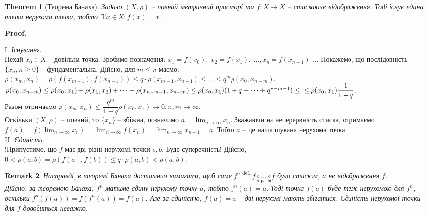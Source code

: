 \documentclass[a4paper, 10pt]{article}
\makeatletter
\theoremstyle{theoremdd}
\newtheorem{theorem}{Theorem}[subsection]
\theoremstyle{theoremdd}
\theoremstyle{theoremdd}
\theoremstyle{theoremdd}
\theoremstyle{theoremdd}
\theoremstyle{theoremdd}
\newtheorem{remark}[theorem]{Remark}
\theoremstyle{theoremdd}
\theoremstyle{theoremdd}
\renewenvironment{proof}[1][Proof.\\]{\par
\pushQED{\hfill \qed}%
\normalfont \topsep6\p@\@plus6\p@\relax
\trivlist
\item\relax
{\bfseries
#1\@addpunct{.}}\hspace\labelsep\ignorespaces
}{%
\popQED\endtrivlist\@endpefalse
}
\makeatother
\begin{document}
\begin{theorem}[Теорема Банаха]
Задано $(X,\rho)$ -- повний метричний просторі та $f \colon X \to X$ -- стискаюче відображення. Тоді існує єдина точка нерухома точка, тобто $\exists ! x \in X: f(x) = x$.
\end{theorem}

\begin{proof}
І. \textit{Існування}.\\
Нехай $x_0 \in X$ -- довільна точка. Зробимо позначення: $x_1 = f(x_0),\ x_2 = f(x_1),\ \dots, x_n = f(x_{n-1}), \dots$ Покажемо, що послідовність $\{x_n, n \geq 0\}$ -- фундаментальна. Дійсно, для $m \leq n$ маємо:\\
$\rho(x_m, x_n) = \rho(f(x_{m-1}), f(x_{n-1})) \leq q \cdot \rho(x_{m-1},x_{n-1}) \leq \dots \leq q^m \rho(x_0,x_{n-m})$.\\
$\rho(x_0,x_{n-m}) \leq \rho(x_0,x_1) + \rho(x_1,x_2) + \dots + \rho(x_{n-m-1}, x_{n-m}) \leq \rho(x_0,x_1)(1+q+\dots+q^{n-m-1}) \leq \\
\leq \rho (x_0,x_1) \dfrac{1}{1-q}$.\\
Разом отримаємо $\rho(x_m,x_n) \leq \dfrac{q^m}{1-q} \rho(x_0,x_1) \to 0, n,m \to \infty$.\\
Оскільки $(X,\rho)$ -- повний, то $\{x_n\}$ -- збіжна, позначимо $a = \displaystyle\lim_{n \to \infty} x_n$. Зважаючи на неперервність стиска, отримаємо $\displaystyle f(a) = f\left( \lim_{n \to \infty} x_n \right) = \lim_{n \to \infty} f(x_n) = \lim_{n \to \infty} x_{n+1} = a$. Тобто $a$ -- це наша шукана нерухома точка.
\bigskip \\
II. \textit{Єдиність}.\\
!Припустимо, що $f$ має дві різні нерухомі точки $a,b$. Буде суперечність! Дійсно,\\
$0 < \rho(a,b) = \rho(f(a),f(b)) \leq q \cdot \rho(a,b) < \rho(a,b)$.
\end{proof}

\begin{remark}
Насправді, в теоремі Банаха достатньо вимагати, щоб саме $f^n \overset{\text{def.}}{=} \underset{n\text{ разів}}{f \circ \dots \circ f}$ було стиском, а не відображення $f$.\\
Дійсно, за теоремою Банаха, $f^n$ матиме єдину нерухому точку $a$, тобто $f^n(a) = a$. Тоді точка $f(a)$ буде теж нерухомою для $f^n$, оскільки $f^n(f(a)) = f(f^n(a)) = f(a)$. Але за єдиністю, $f(a) = a$ -- дві нерухомі мають збігатися. Єдиність нерухомої точки для $f$ доводиться неважко.
\end{remark}
\end{document}
